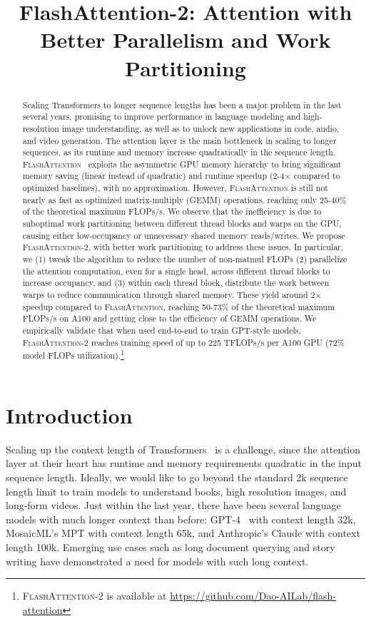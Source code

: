 \title{FlashAttention-2: Attention with Better Parallelism and Work Partitioning}

\begin{abstract}
Scaling Transformers to longer sequence lengths has been a major problem in the last several years, promising to improve performance in language modeling and high-resolution image understanding, as well as to unlock new applications in code, audio, and video generation. The attention layer is the main bottleneck in scaling to longer sequences, as its runtime and memory increase quadratically in the sequence length.
\textsc{FlashAttention}~\citep{dao2022flashattention} exploits the asymmetric GPU memory hierarchy to bring significant memory saving (linear instead of quadratic) and runtime speedup (2-4$\times$ compared to optimized baselines), with no approximation. However, \textsc{FlashAttention} is still not nearly as fast as optimized matrix-multiply (GEMM) operations, reaching only 25-40\% of the theoretical maximum FLOPs/s. We observe that the inefficiency is due to suboptimal work partitioning between different thread blocks and warps on the GPU, causing either low-occupancy or unnecessary shared memory reads/writes. We propose \textsc{FlashAttention-2}, with better work partitioning to address these issues. In particular, we (1) tweak the algorithm to reduce the number of non-matmul FLOPs (2) parallelize the attention computation, even for a single head, across different thread blocks to increase occupancy, and (3) within each thread block, distribute the work between warps to reduce communication through shared memory. These yield around 2$\times$ speedup compared to \textsc{FlashAttention}, reaching 50-73\% of the theoretical maximum FLOPs/s on A100 and getting close to the efficiency of GEMM operations. We empirically validate that when used end-to-end to train GPT-style models,
\textsc{FlashAttention-2} reaches training speed of up to 225 TFLOPs/s per A100 GPU (72\% model FLOPs utilization).\footnote{\textsc{FlashAttention-2}
  is available at \url{https://github.com/Dao-AILab/flash-attention}}
\end{abstract}

\section{Introduction}
\label{sec:intro}

Scaling up the context length of Transformers~\citep{vaswani2017attention} is a challenge, since the attention layer at their heart has runtime and memory requirements quadratic in the input sequence length. Ideally, we would like to go beyond the standard 2k sequence length limit to train models to understand books, high resolution images, and long-form videos. Just within the last year, there have been several language models with much longer context than before: GPT-4~\citep{OpenAI2023GPT4TR} with context length 32k, MosaicML's MPT with context length 65k, and Anthropic's Claude with context length 100k. Emerging use cases such as long document querying and story writing have demonstrated a need for models with such long context.

